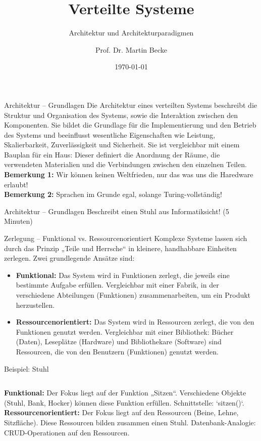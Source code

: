 \documentclass{beamer}
\title{Verteilte Systeme}
\subtitle{Architektur und Architekturparadigmen}
\author{Prof. Dr. Martin Becke}
\date{\today}
\begin{document}
\begin{frame}
    \titlepage
\end{frame}

\begin{frame}{Architektur -- Grundlagen}
    Die Architektur eines verteilten Systems beschreibt die Struktur und Organisation des Systems, sowie die Interaktion zwischen den Komponenten. Sie bildet die Grundlage für die Implementierung und den Betrieb des Systems und beeinflusst wesentliche Eigenschaften wie Leistung, Skalierbarkeit, Zuverlässigkeit und Sicherheit. 
    \newline \newline
    Sie ist vergleichbar mit einem Bauplan für ein Haus: Dieser definiert die Anordnung der Räume, die verwendeten Materialien und die Verbindungen zwischen den einzelnen Teilen.
    \newline \newline
    \textbf{Bemerkung 1:} Wir können keinen Weltfrieden, nur das was uns die Haredware erlaubt!\\
    \textbf{Bemerkung 2:} Sprachen im Grunde egal, solange Turing-vollständig!
\end{frame}

\begin{frame}{Architektur -- Grundlagen}
    Beschreibt einen Stuhl aus Informatiksicht! (5 Minuten)
\end{frame}

\begin{frame}{Zerlegung -- Funktional vs. Ressourcenorientiert}
    Komplexe Systeme lassen sich durch das Prinzip „Teile und Herrsche“ in kleinere, handhabbare Einheiten zerlegen. Zwei grundlegende Ansätze sind:
    \begin{itemize}
        \item \textbf{Funktional:} Das System wird in Funktionen zerlegt, die jeweils eine bestimmte Aufgabe erfüllen. Vergleichbar mit einer Fabrik, in der verschiedene Abteilungen (Funktionen) zusammenarbeiten, um ein Produkt herzustellen.
        \item \textbf{Ressourcenorientiert:} Das System wird in Ressourcen zerlegt, die von den Funktionen genutzt werden. Vergleichbar mit einer Bibliothek: Bücher (Daten), Leseplätze (Hardware) und Bibliothekare (Software) sind Ressourcen, die von den Benutzern (Funktionen) genutzt werden.
    \end{itemize}
\end{frame}

\begin{frame}{Beispiel: Stuhl}
    \begin{columns}
        \textbf{Funktional:} Der Fokus liegt auf der Funktion „Sitzen“. Verschiedene Objekte (Stuhl, Bank, Hocker) können diese Funktion erfüllen. \newline Schnittstelle: `sitzen()`.
        \textbf{Ressourcenorientiert:} Der Fokus liegt auf den Ressourcen (Beine, Lehne, Sitzfläche). Diese Ressourcen bilden zusammen einen Stuhl. \newline Datenbank-Analogie: CRUD-Operationen auf den Ressourcen.
    \end{columns}
\end{frame}
\end{document}
